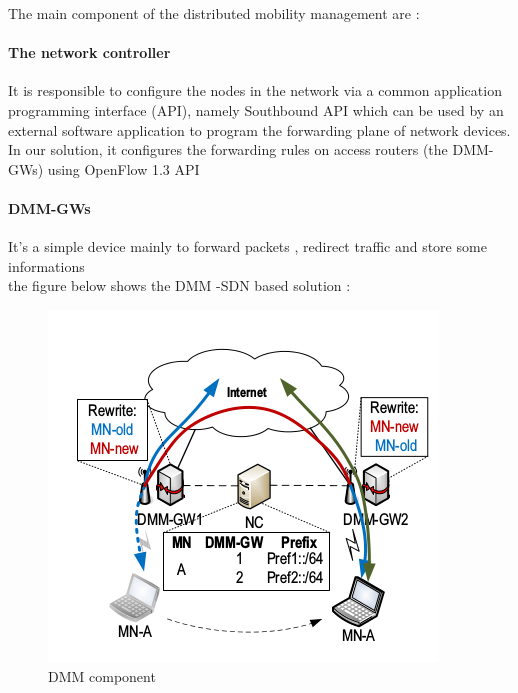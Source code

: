 \documentclass{article}
\begin{document}
The main component of the distributed mobility management are :

\paragraph{The network controller}
It is responsible to configure the nodes in the
network via a common application programming interface (API), namely
Southbound API which can be used by an external software application
to program the forwarding plane of network devices. In our solution,
it configures the forwarding rules on access routers (the DMM-GWs)
using OpenFlow 1.3 API

\paragraph{DMM-GWs}
It's a simple device mainly to forward packets , redirect traffic and
store some informations\\
\newline
the figure below shows the DMM -SDN based solution : 

\begin{figure}[h!]
  \centering
    \includegraphics[scale=0.5]{reportPictures/figure6.png}
  \caption{DMM component}
\end{figure}
\end{document}
